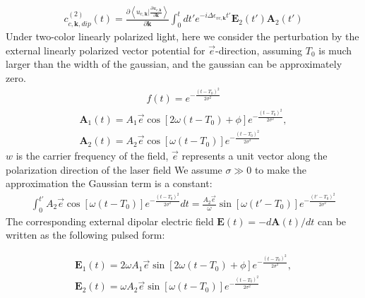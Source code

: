 \begin{align}
     c^{(2)}_{c,\mathbf k,dip}(t) =  \frac{\partial \left \langle u_{c,\mathbf k}\Big |\frac{\partial u_{v,\mathbf k}}{\partial \mathbf k} \right \rangle}{\partial \mathbf k}   \int_0^t dt' e^{-i \Delta \epsilon_{vc,\mathbf k}t'}\mathbf E_2(t')  \mathbf A_2(t') 
    \label{second_dip}
\end{align}
Under two-color linearly polarized light, here we consider the perturbation by the external linearly polarized vector potential for $\vec e$-direction, assuming $T_0$ is much larger than the width of the gaussian, and the gaussian can be approximately zero. 
\begin{align}
f(t)=e^{-\frac{(t-T_0)^2}{2\sigma^2}}    
\end{align}
\begin{align}
   \mathbf A_1(t)=A_1 \vec e \cos[2\omega(t-T_0)+\phi]  e^{-\frac{(t-T_0)^2}{2\sigma^2}}, \\
   \mathbf A_2(t)=A_2 \vec e \cos[\omega(t-T_0)]  e^{-\frac{(t-T_0)^2}{2\sigma^2}}
   \label{vector}
\end{align}
$w$ is the carrier frequency of the field,  $\vec{e}$ represents a unit vector along the polarization direction of the laser field
We assume $\sigma\gg0$ to make the approximation the Gaussian term is a constant:
\begin{align}
    \int_0^{t'} A_2 \vec e \cos[\omega(t-T_0)]  e^{-\frac{(t-T_0)^2}{2\sigma^2}} dt = \frac{A_2 \vec e}{\omega} \sin[\omega(t'-T_0)]  e^{-\frac{(t'-T_0)^2}{2\sigma^2}}    
\end{align}
The corresponding external dipolar electric field $\mathbf E(t)=-d\mathbf A(t)/dt$ can be written as the following pulsed form:

\begin{align}
   \mathbf E_1(t)=2\omega A_1 \vec e \sin[2\omega (t-T_0)+\phi]  e^{-\frac{(t-T_0)^2}{2\sigma^2}}, \\
   \mathbf E_2(t)=\omega A_2 \vec e \sin[\omega (t-T_0)]  e^{-\frac{(t-T_0)^2}{2\sigma^2}}
   \label{feild}
\end{align}

